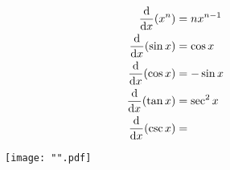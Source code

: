 \documentclass{article}
\begin{document}
\insertTitle

\[
\begin{aligned}
    \dv{x}\pqty{x^n} &= nx^{n-1} \\
    \dv{x}\pqty{\sin x} &= \cos x \\
    \dv{x}\pqty{\cos x} &= -\sin x \\
    \dv{x}\pqty{\tan x} &= \sec^2 x \\
    \dv{x}\pqty{\csc x} &= 
\end{aligned}
\]

\begin{figure}[H]
\centering
\texttt{[image: "".pdf]}
\end{figure}
\end{document}
